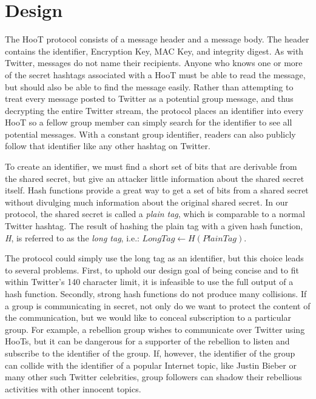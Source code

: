 \section{Design}
\label{sec:design}

The HooT protocol consists of a message header and a message body. The header contains the identifier, Encryption Key, MAC Key, and integrity digest. As with Twitter, messages do not name their recipients. Anyone who knows one or more of the secret hashtags associated with a HooT must be able to read the message, but should also be able to find the message easily. Rather than attempting to treat every message posted to Twitter as a potential group message, and thus decrypting the entire Twitter stream, the protocol places an identifier into every HooT so a fellow group member can simply search for the identifier to see all potential messages. With a constant group identifier, readers can also publicly follow that identifier like any other hashtag on Twitter.

To create an identifier, we must find a short set of bits that are derivable from the shared secret, but give an attacker little information about the shared secret itself. Hash functions provide a great way to get a set of bits from a shared secret without divulging much information about the original shared secret. In our protocol, the shared secret is called a \textit{plain tag}, which is comparable to a normal Twitter hashtag. The result of hashing the plain tag with a given hash function, \textit{H}, is referred to as the \textit{long tag}, i.e.: $\mathit{LongTag} \leftarrow H\left(\mathit{PlainTag}\right)$.

The protocol could simply use the long tag as an identifier, but this choice leads to several problems. First, to uphold our design goal of being concise and to fit within Twitter's 140 character limit, it is infeasible to use the full output of a hash function. Secondly, strong hash functions do not produce many collisions. If a group is communicating in secret, not only do we want to protect the content of the communication, but we would like to conceal subscription to a particular group. For example, a rebellion group wishes to communicate over Twitter using HooTs, but it can be dangerous for a supporter of the rebellion to listen and subscribe to the identifier of the group. If, however, the identifier of the group can collide with the identifier of a popular Internet topic, like Justin Bieber or many other such Twitter celebrities, group followers can shadow their rebellious activities with other innocent topics. 

